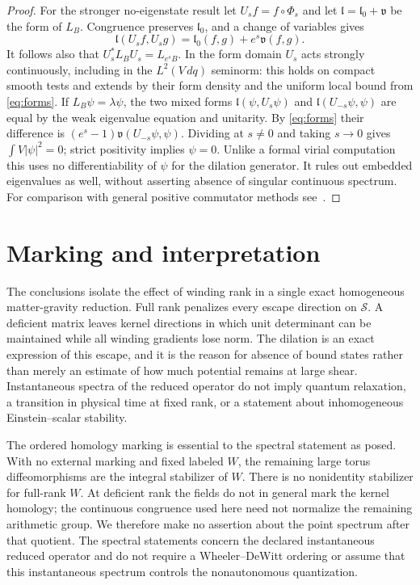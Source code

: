 \documentclass[10pt]{article}
\begin{document}
\begin{proof}
For the stronger no-eigenstate result let $U_s f=f\circ\Phi_s$ and let $\mathfrak l=\mathfrak l_0+\mathfrak v$ be the form of $L_B$. Congruence preserves $\mathfrak l_0$, and a change of variables gives
\begin{equation}
 \mathfrak l(U_s f,U_s g)=\mathfrak l_0(f,g)+e^s\mathfrak v(f,g).
 \label{eq:forms}
\end{equation}
It follows also that $U_s^* L_B U_s=L_{e^s B}$. In the form domain $U_s$ acts strongly continuously, including in the $L^2(V\,dq)$ seminorm: this holds on compact smooth tests and extends by their form density and the uniform local bound from \eqref{eq:forms}. If $L_B\psi=\lambda\psi$, the two mixed forms $\mathfrak l(\psi,U_s\psi)$ and $\mathfrak l(U_{-s}\psi,\psi)$ are equal by the weak eigenvalue equation and unitarity. By \eqref{eq:forms} their difference is $(e^s-1)\mathfrak v(U_{-s}\psi,\psi)$. Dividing at $s\ne0$ and taking $s\to0$ gives $\int V|\psi|^2=0$; strict positivity implies $\psi=0$. Unlike a formal virial computation this uses no differentiability of $\psi$ for the dilation generator. It rules out embedded eigenvalues as well, without asserting absence of singular continuous spectrum. For comparison with general positive commutator methods see~\cite{Virial}.
\end{proof}

\section{Marking and interpretation}

The conclusions isolate the effect of winding rank in a single exact homogeneous matter-gravity reduction. Full rank penalizes every escape direction on $\mathcal S$. A deficient matrix leaves kernel directions in which unit determinant can be maintained while all winding gradients lose norm. The dilation is an exact expression of this escape, and it is the reason for absence of bound states rather than merely an estimate of how much potential remains at large shear. Instantaneous spectra of the reduced operator do not imply quantum relaxation, a transition in physical time at fixed rank, or a statement about inhomogeneous Einstein--scalar stability.

The ordered homology marking is essential to the spectral statement as posed. With no external marking and fixed labeled $W$, the remaining large torus diffeomorphisms are the integral stabilizer of $W$. There is no nonidentity stabilizer for full-rank $W$. At deficient rank the fields do not in general mark the kernel homology; the continuous congruence used here need not normalize the remaining arithmetic group. We therefore make no assertion about the point spectrum after that quotient. The spectral statements concern the declared instantaneous reduced operator and do not require a Wheeler--DeWitt ordering or assume that this instantaneous spectrum controls the nonautonomous quantization.
\end{document}
